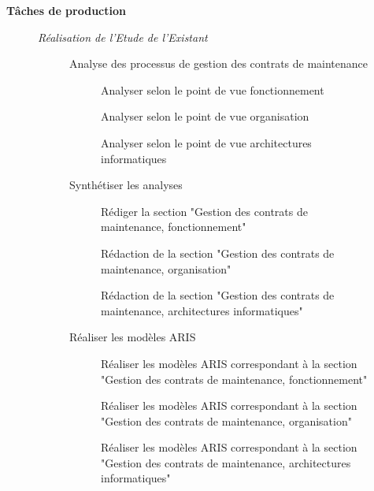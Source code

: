 \begin{description}
    \item[] \bf{Tâches de production}
        \begin{description}
            \item[\textbullet] \it{Réalisation de l'Etude de l'Existant}
                \begin{description}
                    \item[\textbullet] Analyse des processus de gestion des contrats de maintenance
                        \begin{description}
                            \item[\textbullet] Analyser selon le point de vue fonctionnement
                            \item[\textbullet] Analyser selon le point de vue organisation
                            \item[\textbullet] Analyser selon le point de vue architectures informatiques
                        \end{description}
                    \item[\textbullet] Synthétiser les analyses
                        \begin{description}
                            \item[\textbullet] Rédiger la section "Gestion des contrats de maintenance, fonctionnement"
                            \item[\textbullet] Rédaction de la section "Gestion des contrats de maintenance, organisation"
                            \item[\textbullet] Rédaction de la section "Gestion des contrats de maintenance, architectures informatiques"
                        \end{description}
                    \item[\textbullet] Réaliser les modèles ARIS
                        \begin{description}
                            \item[\textbullet] Réaliser les modèles ARIS correspondant à la section "Gestion des contrats de maintenance, fonctionnement"
                            \item[\textbullet] Réaliser les modèles ARIS correspondant à la section "Gestion des contrats de maintenance, organisation"
                            \item[\textbullet] Réaliser les modèles ARIS correspondant à la section "Gestion des contrats de maintenance, architectures informatiques"

\end{description}
\end{description}
\end{description}
\end{description}
